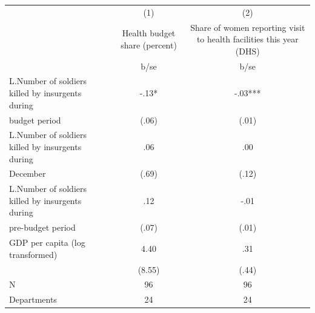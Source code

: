 {
\def\sym#1{\ifmmode^{#1}\else\(^{#1}\)\fi}
\begin{tabular}{l*{2}{c}}
\hline\hline
                                                  &\multicolumn{1}{c}{(1)}&\multicolumn{1}{c}{(2)}\\
                                                  &\multicolumn{1}{c}{Health budget share (percent)}&\multicolumn{1}{c}{Share of women reporting visit to health facilities this year (DHS)}\\
                                                  &        b/se   &        b/se   \\
\hline
L.Number of soldiers killed by insurgents during  &        -.13*  &        -.03***\\
budget period                                     &       (.06)   &       (.01)   \\
L.Number of soldiers killed by insurgents during  &         .06   &         .00   \\
December                                          &       (.69)   &       (.12)   \\
L.Number of soldiers killed by insurgents during  &         .12   &        -.01   \\
pre-budget period                                 &       (.07)   &       (.01)   \\
GDP per capita (log transformed)                  &        4.40   &         .31   \\
                                                  &      (8.55)   &       (.44)   \\
\hline
N                                                 &          96   &          96   \\
Departments                                       &          24   &          24   \\
\hline\hline
\end{tabular}
}
